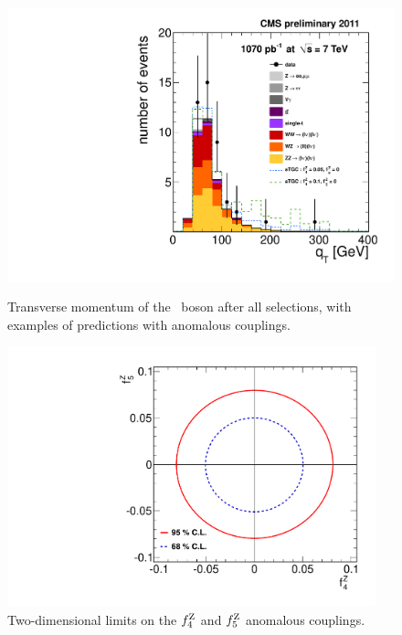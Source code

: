\begin{figure}[h]
\begin{minipage}[t]{0.48\linewidth}
\centering
    \includegraphics[width=1\textwidth]{figures/ZZ_2l2n/ZPtWithATGCs.pdf}
    \caption{ Transverse momentum of the \PZ\ boson after all selections, with examples of predictions with anomalous couplings. 
      \label{fig:ZZZaTGC_ZPt}}
\end{minipage}
\hspace{0.5cm}
\begin{minipage}[t]{0.48\linewidth}
\centering
    \includegraphics[width=0.95\textwidth]{figures/ZZ_2l2n/ZZZaTGC.pdf}
    \caption{ Two-dimensional limits on the $f_{4}^{\mathrm{Z}}$ and $f_{5}^{\mathrm{Z}}$ anomalous couplings.
      \label{fig:ZZZaTGC_2D}}
\end{minipage}
\end{figure}
